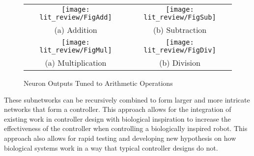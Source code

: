 \begin{figure}
\centering
\begin{tabular}{cc}
\texttt{[image: lit\_review/FigAdd]} &
\texttt{[image: lit\_review/FigSub]} \\
(a) Addition & (b) Subtraction \\
\texttt{[image: lit\_review/FigMul]} &
\texttt{[image: lit\_review/FigDiv]} \\
(a) Multiplication & (b) Division \\
\end{tabular}
\caption{Neuron Outputs Tuned to Arithmetic Operations}
\label{fig:MathOutputs}
\end{figure}

These subnetworks can be recursively combined to form larger and more intricate
networks that form a controller. This approach allows for the integration of
existing work in controller design with biological inspiration to increase the
effectiveness of the controller when controlling a biologically inspired robot.
This approach also allows for rapid testing and developing new hypothesis on how
biological systems work in a way that typical controller designs do not.
